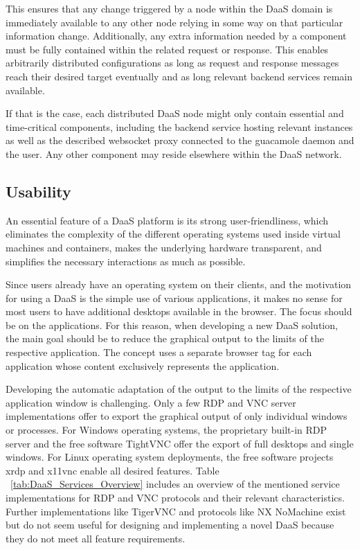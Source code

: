\documentclass[runningheads]{llncs}
\begin{document}
This ensures that any change triggered by a node within the DaaS domain
is immediately available to any other node relying in some way
on that particular information change.
Additionally, any extra information needed by a component must be fully contained
within the related request or response.
This enables arbitrarily distributed configurations as long as request
and response messages reach their desired target eventually
and as long relevant backend services remain available.

If that is the case, each distributed DaaS node might only contain essential and time-critical components,
including the backend service hosting relevant instances as well as the described
websocket proxy connected to the guacamole daemon and the user.
Any other component may reside elsewhere within the DaaS network.

\subsection{Usability}


An essential feature of a DaaS platform is its strong user-friendliness, which eliminates the complexity of the different operating systems used inside virtual machines and containers, makes the underlying hardware transparent, and simplifies the necessary interactions as much as possible.

Since users already have an operating system on their clients, and the motivation for using a DaaS is the simple use of various applications, it makes no sense for most users to have additional desktops available in the browser. The focus should be on the applications. For this reason, when developing a new DaaS solution, the main goal should be to reduce the graphical output to the limits of the respective application. The concept uses a separate browser tag for each application whose content exclusively represents the application.

Developing the automatic adaptation of the output to the limits of the respective application window is challenging. Only a few RDP and VNC server implementations offer to export the graphical output of only individual windows or processes. For Windows operating systems, the proprietary built-in RDP server and the free software TightVNC offer the export of full desktops and single windows. For Linux operating system deployments, the free software projects xrdp and x11vnc enable all desired features. Table ~\ref{tab:DaaS_Services_Overview} includes an overview of the mentioned service implementations for RDP and VNC protocols and their relevant characteristics. Further implementations like TigerVNC and protocols like NX NoMachine exist but do not seem useful for designing and implementing a novel DaaS because they do not meet all feature requirements.~\cite{OJCC_2023v8i1n01_Baun}
\end{document}
